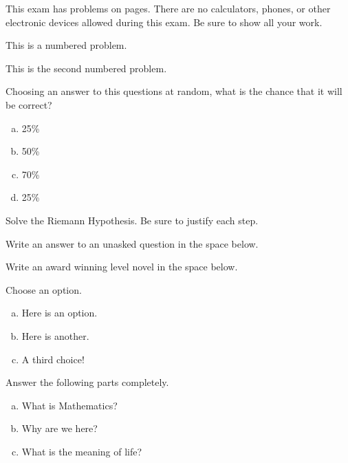 \documentclass[12pt,letterpaper]{article}
\begin{document}

\noindent This exam has  problems on \pageref{LastPage} pages. There are no calculators, phones, or other electronic devices allowed during this exam. Be sure to show all your work. \vspace{1cm}

\namescoreline


\problem This is a numbered problem. \vspace{3cm}



\problem This is the second numbered problem. \vfill



\problem Choosing an answer to this questions at random, what is the chance that it will be correct?
	\begin{enumerate}[(a)]
	\item 25\%
	\item 50\%
	\item 70\%
	\item 25\%
	\end{enumerate} \vfill



\newpage



\problem Solve the Riemann Hypothesis. Be sure to justify each step.



\newpage
\problem Write an answer to an unasked question in the space below. \pspace
\emptybox{2in}



\newpage
\problem Write an award winning level novel in the space below. \pspace
\emptybox{8in}



\newpage
\problem Choose an option.
	\begin{enumerate}[(a)]
	\item Here is an option.
	\item Here is another.
	\item A third choice!
	\end{enumerate}



\newpage
\problem Answer the following parts completely. \vspace{0.5cm}
	\begin{enumerate}[(a)]
	\item What is Mathematics? \vspace{2cm}
	\item Why are we here? \vfill
	\item What is the meaning of life? \vfill
	\end{enumerate}
	
\end{document}

